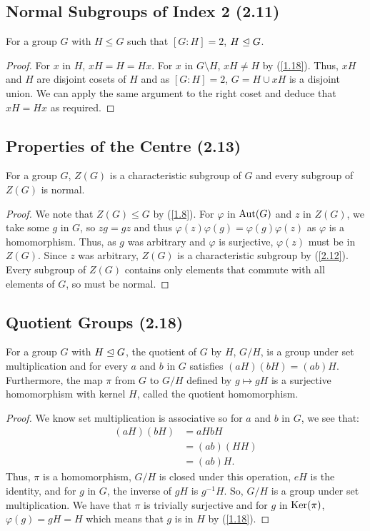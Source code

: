 \subsection{Normal Subgroups of Index 2 (2.11)} \label{2.11}

For a group $G$ with $H \leq G$ such that $[G : H] = 2$, $H \trianglelefteq G$.

\begin{proof}
    For $x$ in $H$, $xH = H = Hx$.
    For $x$ in $G \setminus H$, $xH \neq H$ by (\ref{1.18}).
    Thus, $xH$ and $H$ are disjoint cosets of $H$ and as $[G : H] = 2$, 
    $G = H \cup xH$ is a disjoint union. We can apply the same argument 
    to the right coset and deduce that $xH = Hx$ as required.
\end{proof}

\subsection{Properties of the Centre (2.13)} \label{2.13}

For a group $G$, $Z(G)$ is a characteristic subgroup of $G$ and every
subgroup of $Z(G)$ is normal.

\begin{proof}
    We note that $Z(G) \leq G$ by (\ref{1.8}). For $\varphi$ in $\operatorname{Aut}(G)$ and $z$
    in $Z(G)$, we take some $g$ in $G$, so $zg = gz$ and thus 
    $\varphi(z)\varphi(g) = \varphi(g)\varphi(z)$ as 
    $\varphi$ is a homomorphism. Thus, as $g$ was arbitrary and $\varphi$ is surjective, 
    $\varphi(z)$ must be in $Z(G)$. Since $z$ was arbitrary, $Z(G)$
    is a characteristic subgroup by (\ref{2.12}).
    Every subgroup of $Z(G)$ contains only elements that commute with
    all elements of $G$, so must be normal.
\end{proof}

\subsection{Quotient Groups (2.18)} \label{2.18}

For a group $G$ with $H \trianglelefteq G$, the quotient of $G$ by $H$, 
$G / H$, is a group under
set multiplication and for every $a$ and $b$ in $G$ satisfies
$(aH)(bH) = (ab)H$. Furthermore, the map $\pi$ from $G$ to $G / H$
defined by $g \mapsto gH$ is a surjective homomorphism with
kernel $H$, called the quotient homomorphism.

\begin{proof}
    We know set multiplication is associative so for 
    $a$ and $b$ in $G$, we see that: \begin{align*}
        (aH)(bH) &= aHbH \\
        &= (ab)(HH) \tag{$H \nsub G$} \\
        &= (ab)H.
    \end{align*} Thus, $\pi$ is a homomorphism, $G / H$ is closed under this operation,
    $eH$ is the identity, and for $g$ in $G$, the inverse of $gH$ is $g^{-1}H$. 
    So, $G/H$ is a group under set multiplication.
    We have that $\pi$ is trivially surjective and for $g$ in $\operatorname{Ker}(\pi)$,
    $\varphi(g) = gH = H$ which means that $g$ is in $H$ by (\ref{1.18}).
\end{proof} 
